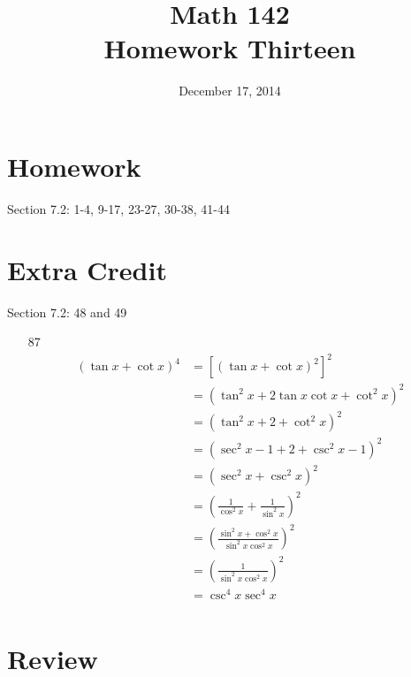\documentclass{exam}
\author{}
\date{December 17, 2014}
\title{Math 142 \\ Homework Thirteen}
\begin{document}
  \maketitle

  \section{Homework}
  Section 7.2: 1-4, 9-17, 23-27, 30-38, 41-44

  \section{Extra Credit}
  Section 7.2: 48 and 49

  \ifprintanswers
    \pagebreak
    \begin{enumerate}

      \item[87] 
        \begin{align*}
          (\tan x + \cot x)^4 & = \left[ (\tan x + \cot x)^2 \right]^2 \\
                              & = \left( \tan^2 x + 2 \tan x \cot x + \cot^2 x \right)^2 \\
                              & = \left( \tan^2 x + 2 + \cot^2 x \right)^2 \\
                              & = \left( \sec^2 x - 1 + 2 + \csc^2 x - 1 \right)^2 \\
                              & = \left( \sec^2 x + \csc^2 x \right)^2 \\
                              & = \left( \frac{1}{\cos^2 x} + \frac{1}{\sin^2 x} \right)^2 \\
                              & = \left( \frac{\sin^2 x + \cos^2 x}{\sin^2 x \cos^2 x} \right)^2 \\
                              & = \left( \frac{1}{\sin^2 x \cos^2 x} \right)^2 \\
                              & = \csc^4 x \sec^4 x \\
        \end{align*}

    \end{enumerate}
  \fi

  \section{Review}

  \ifprintanswers
\end{document}
